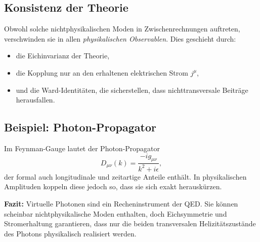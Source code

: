 \subsection*{Konsistenz der Theorie}
Obwohl solche nichtphysikalischen Moden in Zwischenrechnungen 
auftreten, verschwinden sie in allen \emph{physikalischen Observablen}.  
Dies geschieht durch:
\begin{itemize}
	\item die Eichinvarianz der Theorie,
	\item die Kopplung nur an den erhaltenen elektrischen Strom \( j^\mu \),
	\item und die Ward-Identitäten, die sicherstellen, 
	dass nichttransversale Beiträge herausfallen.
\end{itemize}

\subsection*{Beispiel: Photon-Propagator}
Im Feynman-Gauge lautet der Photon-Propagator
\[
D_{\mu\nu}(k) = \frac{-i g_{\mu\nu}}{k^2 + i\epsilon} ,
\]
der formal auch longitudinale und zeitartige Anteile enthält.  
In physikalischen Amplituden koppeln diese jedoch so,
dass sie sich exakt herauskürzen.

\medskip
\textbf{Fazit:}  
Virtuelle Photonen sind ein Recheninstrument der QED.  
Sie können scheinbar nichtphysikalische Moden enthalten, 
doch Eichsymmetrie und Stromerhaltung garantieren, 
dass nur die beiden transversalen Helizitätszustände des Photons 
physikalisch realisiert werden.
